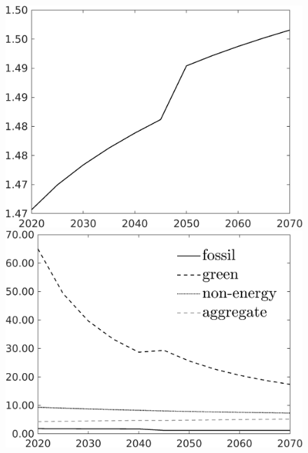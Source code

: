\begin{figure}[h!!]
\begin{minipage}[]{0.32\textwidth}
	\end{minipage}
	\begin{minipage}[]{0.32\textwidth}
		\includegraphics[width=1\textwidth]{../../codding_model/own_basedOnFried/optimalPol_190722_tidiedUp/figures/all_Aout22/Single_OPT_T_NoTaus_hhhl_regime3_spillover0_noskill0_sep1_xgrowth0_extern0_etaa0.79.png}
	\end{minipage}
	\begin{minipage}[]{0.32\textwidth}
		\includegraphics[width=1\textwidth]{../../codding_model/own_basedOnFried/optimalPol_190722_tidiedUp/figures/all_Aout22/SingleJointTOT_regime3_OPT_T_NoTaus_Growth_spillover0_noskill0_sep1_xgrowth0_extern0_PV1_etaa0.79_lgd1.png}

\end{minipage}
\end{figure}
